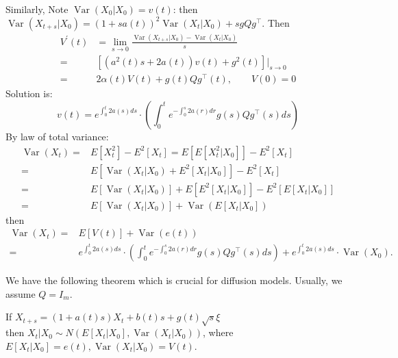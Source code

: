 Similarly, Note $\operatorname{Var}\left(X_{0} | X_{0}\right)=v(t)$:
then $\operatorname{Var}\left(X_{t+s} | X_{0}\right)=(1+s a(t))^{2} \operatorname{Var}\left(X_{t} | X_{0}\right)+s gQg^\top$. Then
\begin{equation}
    \begin{aligned}
        V^{\prime}(t)&=\lim _{s \rightarrow 0} \frac{\operatorname{Var}\left(X_{t+s} | X_{0}\right)-\operatorname{Var}\left(X_{t} | X_{0}\right)}{s}\\
        =&\left[\left(a^{2}(t) s+2 a(t)\right) v(t)+g^{2}(t)\right]|_{s \rightarrow 0}\\ 
        =&2 \alpha(t) V(t)+g(t)Qg^\top(t), \qquad V(0)=0
    \end{aligned}
\end{equation}
Solution is:
\begin{equation}
    v(t)=e^{\int_{0}^{t} 2a(s) d s}\cdot\left(\int_{0}^{t} e^{-\int_{0}^{s} 2 a(r) d r} g(s)Qg^\top(s) d s\right)
\end{equation} 
By law of total variance:
\begin{equation}
    \begin{aligned}
        \operatorname{Var}\left(X_{t}\right)=&E\left[X_{t}^{2}\right]-E^{2}\left[X_{t}\right]=E\left[ E\left[X_{t}^{2} | X_{0}\right]\right]-E^{2}\left[X_{t}\right] \\
        =&E\left[\operatorname{Var}\left(X_{t} | X_{0}\right)+E^{2}\left[X_{t} | X_{0}\right]\right]-E^{2}\left[X_{t}\right] \\
        =&E\left[\operatorname{Var}\left(X_{t} | X_{0}\right)\right]+E\left[E^{2}\left[X_{t} | X_0\right]\right]-E^{2}\left[E\left[X_{t} | X_{0}\right]\right]\\
        =&E\left[\operatorname{Var}\left(X_{t} | X_{0}\right)\right]+\operatorname{Var}\left(E\left[X_{t} | X_0\right]\right)
    \end{aligned}
\end{equation}
then 
\begin{equation}
    \begin{aligned}
        \operatorname{Var}(X_t)=&E[V(t)]+\operatorname{Var}(e(t))\\
        =&e^{\int_{0}^{t} 2 a(s) d s}\cdot \left(\int_{0}^{t} e^{-\int_{0}^{s} 2 a(r) d r} g(s)Qg^\top(s) d s\right) +e^{\int_{0}^{t} 2 a(s) d s} \cdot \operatorname{Var}\left(X_{0}\right) .
    \end{aligned}
\end{equation}

We have the following theorem which is crucial for diffusion models. Usually, we assume $Q=I_m$.
\begin{theorem}
    If  $X_{t+s}=(1+a(t) s) X_{t}+b(t) s+g(t) \sqrt{s} \xi$\\
    then $X_{t} | X_{0} \sim N\left(E\left[X_{t} | X_{0}\right], \operatorname{Var}\left(X_{t} | X_{0}\right)\right)$, 
    where $E\left[X_{t} | X_{0}\right]=e(t), \operatorname{Var}\left(X_{t} | X_{0}\right)=V(t)$.\label{thm1}        
\end{theorem}

